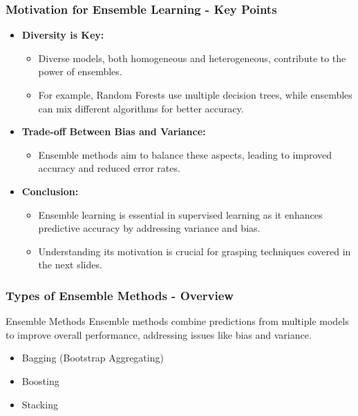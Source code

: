 \documentclass[aspectratio=169]{beamer}
\begin{document}
\begin{frame}[fragile]
    \frametitle{Motivation for Ensemble Learning - Key Points}
    \begin{itemize}
        \item \textbf{Diversity is Key:} 
        \begin{itemize}
            \item Diverse models, both homogeneous and heterogeneous, contribute to the power of ensembles.
            \item For example, Random Forests use multiple decision trees, while ensembles can mix different algorithms for better accuracy.
        \end{itemize}
        
        \item \textbf{Trade-off Between Bias and Variance:} 
        \begin{itemize}
            \item Ensemble methods aim to balance these aspects, leading to improved accuracy and reduced error rates.
        \end{itemize}
        
        \item \textbf{Conclusion:} 
        \begin{itemize}
            \item Ensemble learning is essential in supervised learning as it enhances predictive accuracy by addressing variance and bias.
            \item Understanding its motivation is crucial for grasping techniques covered in the next slides.
        \end{itemize}
    \end{itemize}
\end{frame}

\begin{frame}[fragile]
    \frametitle{Types of Ensemble Methods - Overview}
    \begin{block}{Ensemble Methods}
        Ensemble methods combine predictions from multiple models to improve overall performance, addressing issues like bias and variance.
    \end{block}
    \begin{itemize}
        \item Bagging (Bootstrap Aggregating)
        \item Boosting
        \item Stacking
    \end{itemize}
\end{frame}
\end{document}

